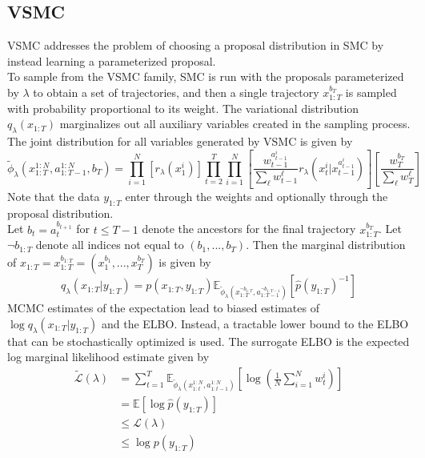 \documentclass[12pt]{article}
\begin{document}
\newpage

\subsection{VSMC}

VSMC addresses the problem of choosing a proposal distribution in SMC by instead learning a parameterized proposal.
\\

To sample from the VSMC family, SMC is run with the proposals parameterized by $\lambda$ to obtain a set of trajectories, and then a single trajectory $x_{1:T}^{b_T}$ is sampled with probability proportional to its weight. The variational distribution $q_\lambda(x_{1:T})$ marginalizes out all auxiliary variables created in the sampling process. The joint distribution for all variables generated by VSMC is given by
\[
\tilde{\phi}_\lambda(x_{1:T}^{1:N},a_{1:T-1}^{1:N},b_T) = \prod_{i=1}^N\left[r_\lambda(x_1^i)\right]\prod_{t=2}^T\prod_{i=1}^N\left[\frac{w_{t-1}^{a_{t-1}^i}}{\sum_\ell w_{t-1}^\ell}r_\lambda(x_t^i|x_{t-1}^{a_{t-1}^i})\right]\left[\frac{w_T^{b_T}}{\sum_\ell w_T^\ell}\right]
\]
Note that the data $y_{1:T}$ enter through the weights and optionally through the proposal distribution.
\\

Let $b_t=a_t^{b_{t+1}}$ for $t\leq T-1$ denote the ancestors for the final trajectory $x_{1:T}^{b_T}$. Let $\neg b_{1:T}$ denote all indices not equal to $(b_1,...,b_T)$. Then the marginal distribution of $x_{1:T}=x_{1:T}^{b_{1:T}}=(x_1^{b_1},...,x_T^{b_T})$ is given by
\[
q_\lambda(x_{1:T}|y_{1:T}) = p(x_{1:T},y_{1:T})\mathbb{E}_{\tilde{\phi}_\lambda(x_{1:T}^{\neg b_{1:T}},a_{1:T-1}^{\neg b_{1:T-1}})}\left[\hat{p}(y_{1:T})^{-1}\right]
\]
MCMC estimates of the expectation lead to biased estimates of $\log q_\lambda(x_{1:T}|y_{1:T})$ and the ELBO. Instead, a tractable lower bound to the ELBO that can be stochastically optimized is used. The surrogate ELBO is the expected log marginal likelihood estimate given by
\begin{align*}
\tilde{\mathcal{L}}(\lambda) &= \sum_{t=1}^T\mathbb{E}_{\tilde{\phi}_\lambda(x_{1:t}^{1:N},a_{1:t-1}^{1:N})}\left[\log\left(\frac{1}{N}\sum_{i=1}^Nw_t^i\right)\right] \\
&= \mathbb{E}[\log\hat{p}(y_{1:T})] \\
&\leq \mathcal{L}(\lambda) \\
&\leq \log p(y_{1:T})
\end{align*}
\end{document}
